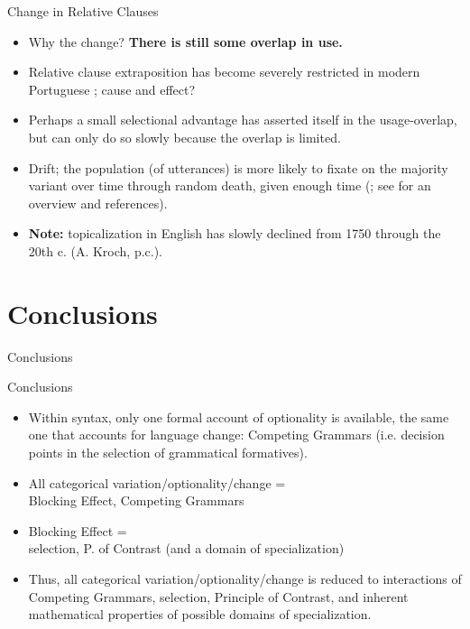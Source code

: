\documentclass[hyperref={pdfpagelabels=false}]{beamer}
\begin{document}
\begin{frame}{Change in Relative Clauses}
\begin{itemize}
	\item Why the change? \textbf{There is still some overlap in use.}
	\item Relative clause extraposition has become severely restricted in modern Portuguese \citep{cardoso2011, cardoso2012}; cause and effect?
	\item Perhaps a small selectional advantage has asserted itself in the usage-overlap, but can only do so slowly because the overlap is limited.
	\item Drift; the population (of utterances) is more likely to fixate on the majority variant over time through random death, given enough time (\citealt{moran1958}; see \citealt{nowak2006} for an overview and references).
	\item \textbf{Note:} topicalization in English has slowly declined from 1750 through the 20th c. (A. Kroch, p.c.).
\end{itemize}
\end{frame}


\section{Conclusions}





\begin{frame}{Conclusions}
	\begin{block}{Conclusions}
		\begin{itemize}
			\item Within syntax, only one formal account of optionality is available, the same one that accounts for language change: Competing Grammars (i.e. decision points in the selection of grammatical formatives).
			\item All categorical variation/optionality/change = \\Blocking Effect, Competing Grammars
			\item Blocking Effect = \\
			selection, P. of Contrast (and a domain of specialization)
			\item Thus, all categorical variation/optionality/change is reduced to interactions of Competing Grammars, selection, Principle of Contrast, and inherent mathematical properties of possible domains of specialization.
				\end{itemize}
	\end{block}
\end{frame}
\end{document}
